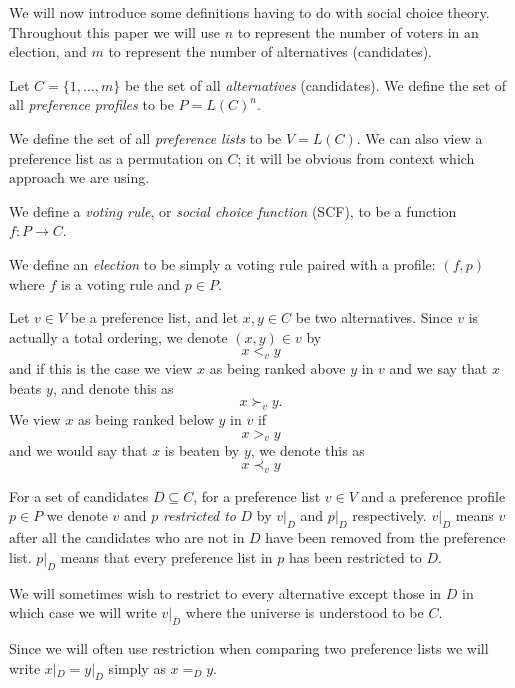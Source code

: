 	We will now introduce some definitions having to do with social choice theory. Throughout this paper we will use $n$ to represent the number of voters in an election, and $m$ to represent the number of alternatives (candidates).

	\begin{definition}
		Let $C = \{1, \ldots, m\}$ be the set of all \emph{alternatives} (candidates). We define the set of all \emph{preference profiles} to be $P = L(C)^n$.
	\end{definition}

	\begin{definition}
		We define the set of all \emph{preference lists} to be $V = L(C)$. We can also view a preference list as a permutation on $C$; it will be obvious from context which approach we are using.
	\end{definition}

	\begin{definition}
		We define a \emph{voting rule}, or \emph{social choice function} (SCF), to be a function $f : P \to C$.
	\end{definition}

	\begin{definition}
		We define an \emph{election} to be simply a voting rule paired with a profile: $(f, p)$ where $f$ is a voting rule and $p \in P$.
	\end{definition}

	\begin{definition}
		Let $v \in V$ be a preference list, and let $x, y \in C$ be two alternatives. Since $v$ is actually a total ordering, we denote $(x, y) \in v$ by
		\[
			x <_v y
		\]
		and if this is the case we view $x$ as being ranked above $y$ in $v$ and we say that $x$ beats $y$, and denote this as
		\[
			x \succ_v y.
		\]
		We view $x$ as being ranked below $y$ in $v$ if
		\[
			x >_v y
		\]
		and we would say that $x$ is beaten by $y$, we denote this as
		\[
			x \prec_v y
		\]
	\end{definition}

	\begin{definition}
		\label{preference-restriction-definition}
		For a set of candidates $D \subseteq C$, for a preference list $v \in V$ and a preference profile $p \in P$ we denote $v$ and $p$ \emph{restricted to} $D$ by $v|_D$ and $p|_D$ respectively. $v|_D$ means $v$ after all the candidates who are not in $D$ have been removed from the preference list. $p|_D$ means that every preference list in $p$ has been restricted to $D$.

		We will sometimes wish to restrict to every alternative except those in $D$ in which case we will write $v|_{\overline{D}}$ where the universe is understood to be $C$.

		Since we will often use restriction when comparing two preference lists we will write $x|_D = y|_D$ simply as $x =_D y$.
	\end{definition}

